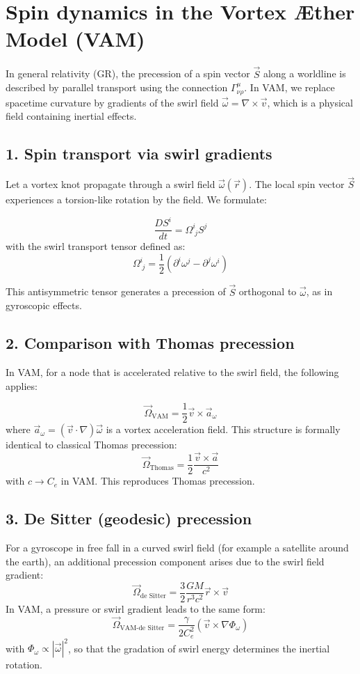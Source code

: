 \section{Spin dynamics in the Vortex Æther Model (VAM)}

In general relativity (GR), the precession of a spin vector \( \vec{S} \) along a worldline is described by parallel transport using the connection \( \Gamma^\mu_{\nu\rho} \). In VAM, we replace spacetime curvature by gradients of the swirl field \( \vec{\omega} = \nabla \times \vec{v} \), which is a physical field containing inertial effects.

\subsection*{1. Spin transport via swirl gradients}
Let a vortex knot propagate through a swirl field \( \vec{\omega}(\vec{r}) \). The local spin vector \( \vec{S} \) experiences a torsion-like rotation by the field. We formulate:

\[
\frac{D S^i}{dt} = \Omega^i_{\;j} S^j
\]
with the swirl transport tensor defined as:
\[
\Omega^i_{\;j} = \frac{1}{2} \left( \partial^i \omega^j - \partial^j \omega^i \right)
\]

\noindent This antisymmetric tensor generates a precession of \( \vec{S} \) orthogonal to \( \vec{\omega} \), as in gyroscopic effects.

\subsection*{2. Comparison with Thomas precession}
In VAM, for a node that is accelerated relative to the swirl field, the following applies:

\[
\vec{\Omega}_\text{VAM} = \frac{1}{2} \vec{v} \times \vec{a}_{\omega}
\]
where \( \vec{a}_{\omega} = (\vec{v} \cdot \nabla) \vec{\omega} \) is a vortex acceleration field. This structure is formally identical to classical Thomas precession:
\[
\vec{\Omega}_\text{Thomas} = \frac{1}{2} \frac{\vec{v} \times \vec{a}}{c^2}
\]
with \( c \rightarrow C_e \) in VAM. This reproduces Thomas precession.

\subsection*{3. De Sitter (geodesic) precession}
For a gyroscope in free fall in a curved swirl field (for example a satellite around the earth), an additional precession component arises due to the swirl field gradient:
\[
\vec{\Omega}_\text{de Sitter} = \frac{3}{2} \frac{GM}{r^3 c^2} \vec{r} \times \vec{v}
\]
In VAM, a pressure or swirl gradient leads to the same form:
\[
\vec{\Omega}_\text{VAM-de Sitter} = \frac{\gamma}{2 C_e^2} (\vec{v} \times \nabla \Phi_\omega)
\]
with \( \Phi_\omega \propto |\vec{\omega}|^2 \), so that the gradation of swirl energy determines the inertial rotation.

